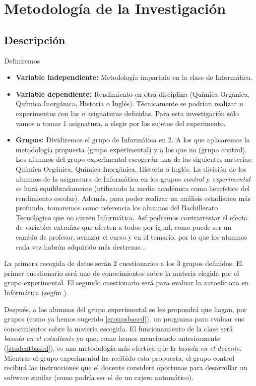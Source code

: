 \documentclass[palatino,miniheader]{apuntesURJC}
\begin{document}
\chapter{Metodología de la Investigación}

\section{Descripción}
Definiremos 
\begin{itemize}
	\item \textbf{Variable independiente:} Metodología impartida en la clase de Informática.
	\item \textbf{Variable dependiente:} Rendimiento en otra disciplina (Química Orgánica, Química Inorgánica, Historia o Inglés).
	\subitem Técnicamente se podrían realizar \textit{n} experimentos con las \textit{n} asignaturas definidas. 
	Para esta investigación sólo vamos a tomar 1 asignatura, a elegir por los sujetos del experimento.
	\item \textbf{Grupos:}
	\subitem Dividiremos el grupo de Informática en 2. A los que aplicaremos la  metodología propuesta (grupo experimental) y a los que no (grupo control).
	Los alumnos del grupo experimental escogerán una de las siguientes materias: Química Orgánica, Química Inorgánica, Historia o Inglés.
	\subitem La división de los alumnos de la asignatura de Informática en los grupos \textit{control} y \textit{experimental} se hará equilibradamente (utilizando la media académica como heurístico del rendimiento escolar).
	\subitem Además, para poder realizar un análisis estadístico más profundo, tomaremos como referencia los alumnos del Bachillerato Tecnológico que no cursen Informática.
	Así podremos contrarrestar el efecto de variables extrañas que afecten a todos por igual, como puede ser un cambio de profesor, avanzar el curso y en el temario, por lo que los alumnos cada vez habrán adquirido más destrezas...
\end{itemize}


La primera recogida de datos serán 2 cuestionarios a los 3 grupos definidos.
%
\label{descDatos}
%
El primer cuestionario será uno de conocimientos sobre la materia elegida por el grupo experimental.
%
El segundo cuestionario será para evaluar la autoeficacia en Informática (según  \cite{CPSES}).

Después, a los alumnos del grupo experimental se les propondrá que hagan, por grupos (como ya hemos sugerido \ref{groupsbased}), un programa para evaluar sus conocimientos sobre la materia escogida.
%
El funcionamiento de la clase será \textit{basado en el estudiante} ya que, como hemos mencionado anteriormente (\ref{studentbased}), es una metodología más efectiva que la \textit{basada en el docente}.
%
Mientras el grupo experimental ha recibido esta propuesta, el grupo control recibirá las instrucciones que el docente considere oportunas para desarrollar un software similar (como podría ser el de un cajero automático).
\end{document}
